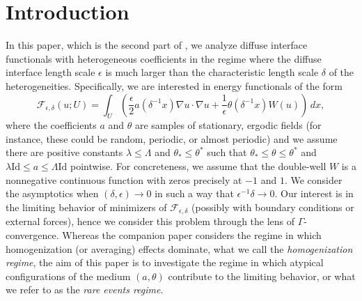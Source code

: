 \documentclass[12pt]{amsart}
\begin{document}
\section{Introduction} In this paper, which is the second part of \cite{part1}, we analyze diffuse interface functionals with heterogeneous coefficients in the regime where the diffuse interface length scale $\epsilon$ is much larger than the characteristic length scale $\delta$ of the heterogeneities.  Specifically, we are interested in energy functionals of the form
	\begin{equation} \label{E: our energy}
		\mathscr{F}_{\epsilon,\delta}(u; U) = \int_{U} \left( \frac{\epsilon}{2} a(\delta^{-1} x) \nabla u \cdot \nabla u + \frac{1}{\epsilon} \theta(\delta^{-1}x) W(u) \right) \, dx,
	\end{equation}
where the coefficients $a$ and $\theta$ are samples of stationary, ergodic fields (for instance, these could be random, periodic, or almost periodic) and we assume there are positive constants $\lambda \leq \Lambda$ and $\theta_{*} \leq \theta^{*}$ such that $\theta_{*} \leq \theta \leq \theta^{*}$ and $\lambda \text{Id} \leq a \leq \Lambda \text{Id}$ pointwise.  For concreteness, we assume that the double-well $W$ is a nonnegative continuous function with zeros precisely at $-1$ and $1$.  We consider the asymptotics when $(\delta,\epsilon ) \to 0$ in such a way that $\epsilon^{-1} \delta \to 0$.  Our interest is in the limiting behavior of minimizers of $\mathscr{F}_{\epsilon,\delta}$ (possibly with boundary conditions or external forces), hence we consider this problem through the lens of $\Gamma$-convergence.  Whereas the companion paper \cite{part1} considers the regime in which homogenization (or averaging) effects dominate, what we call the \emph{homogenization regime}, the aim of this paper is to investigate the regime in which atypical configurations of the medium $(a,\theta)$ contribute to the limiting behavior, or what we refer to as the \emph{rare events regime}.
\end{document}

